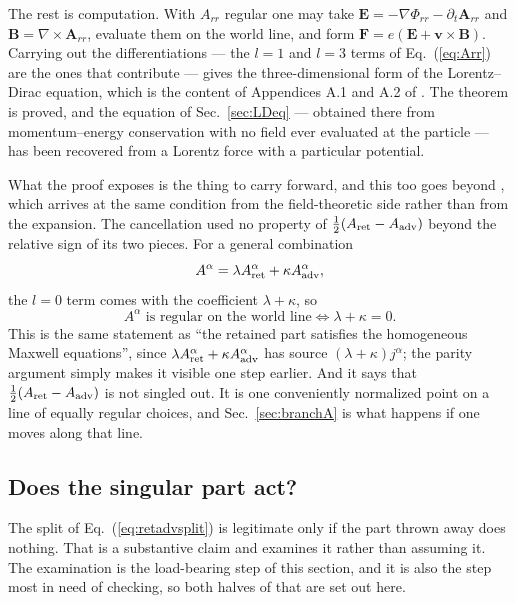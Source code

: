 \documentclass[preprint]{aastex701}
\newcommand{\Aret}{A^\alpha_{\rm ret}}
\newcommand{\Aadv}{A^\alpha_{\rm adv}}
\begin{document}
The rest is computation. With $A_{rr}$ regular one may take
$\mathbf E = -\nabla\Phi_{rr} - \partial_t\mathbf A_{rr}$ and
$\mathbf B = \nabla\times\mathbf A_{rr}$, evaluate them on the world line, and
form $\mathbf F = e(\mathbf E + \mathbf v\times\mathbf B)$. Carrying out the
differentiations --- the $l=1$ and $l=3$ terms of Eq.~(\ref{eq:Arr}) are the
ones that contribute --- gives the three-dimensional form of the
Lorentz--Dirac equation, which is the content of Appendices A.1 and A.2 of
\citet{zhang2006}. The theorem is proved, and the equation of
Sec.~\ref{sec:LDeq} --- obtained there from momentum--energy conservation with
no field ever evaluated at the particle --- has been recovered from a Lorentz
force with a particular potential.

What the proof exposes is the thing to carry forward, and this too goes
beyond \citet{zhang2006}, which arrives at the same condition from the
field-theoretic side rather than from the expansion. The cancellation used no
property of $\tfrac12(A_{\rm ret}-A_{\rm adv})$ beyond the relative sign of its
two pieces. For a general combination
\begin{equation}
A^\alpha = \lambda\Aret + \kappa\Aadv ,
\label{eq:lkfamily}
\end{equation}
the $l=0$ term comes with the coefficient $\lambda+\kappa$, so
\begin{equation}
A^\alpha \text{ is regular on the world line}
\iff
\lambda + \kappa = 0 .
\label{eq:regularity}
\end{equation}
This is the same statement as ``the retained part satisfies the homogeneous
Maxwell equations'', since $\lambda\Aret + \kappa\Aadv$ has source
$(\lambda+\kappa)j^\alpha$; the parity argument simply makes it visible one
step earlier. And it says that $\tfrac12(A_{\rm ret}-A_{\rm adv})$ is not
singled out. It is one conveniently normalized point on a line of equally
regular choices, and Sec.~\ref{sec:branchA} is what happens if one moves along
that line.

\subsection{Does the singular part act?}
\label{sec:doesitact}

The split of Eq.~(\ref{eq:retadvsplit}) is legitimate only if the part thrown
away does nothing. That is a substantive claim and
\citet{zhang2006} examines it rather than assuming it. The examination is the
load-bearing step of this section, and it is also the step most in need of
checking, so both halves of that are set out here.
\end{document}
